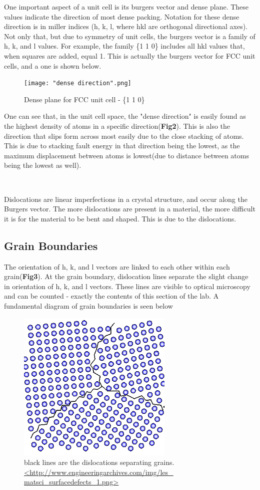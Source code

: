 \documentclass{article}
\begin{document}
One important aspect of a unit cell is its burgers vector and dense plane. These values indicate the direction of most dense packing. Notation for these dense direction is in miller indices (h, k, l, where hkl are orthogonal directional axes). Not only that, but due to symmetry of unit cells, the burgers vector is a family of h, k, and l values. For example, the family \{1 1 0\} includes all hkl values that, when squares are added, equal 1. This is actually the burgers vector for FCC unit cells, and a one is shown below.

\begin{figure}[h]
	\centering
	\texttt{[image: "dense direction".png]}
	\caption{Dense plane for FCC unit cell - \{1 1 0\}}
\end{figure}

One can see that, in the unit cell space, the "dense direction" is easily found as the highest density of atoms in a specific direction(\textbf{Fig2}). This is also the direction that slips form across most easily due to the close stacking of atoms. This is due to stacking fault energy in that direction being the lowest, as the maximum displacement between atoms is lowest(due to distance between atoms being the lowest as well).

\ 

Dislocations are linear imperfections in a crystal structure, and occur along the Burgers vector. The more dislocations are present in a material, the more difficult it is for the material to be bent and shaped. This is due to the dislocations.

\subsection{Grain Boundaries} 

The orientation of h, k, and l vectors are linked to each other within each grain(\textbf{Fig3}). At the grain boundary, dislocation lines separate the slight change in orientation of h, k, and l vectors. These lines are visible to optical microscopy and can be counted - exactly the contents of this section of the lab. A fundamental diagram of grain boundaries is seen below

\begin{figure}[h]
	\centering
	\includegraphics[scale=.6]{grain.png}
	\caption{black lines are the dislocations separating grains. \url{<http://www.engineeringarchives.com/img/les\_ matsci_surfacedefects_1.png>}}
\end{figure}
\end{document}
